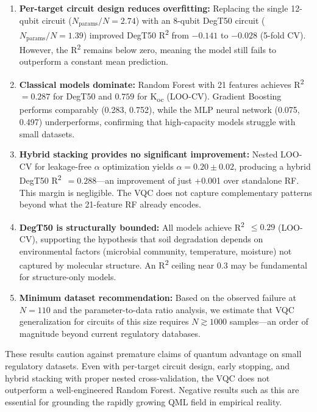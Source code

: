 \documentclass[twoside,twocolumn,9pt]{article}
\newcommand{\degtl}{DegT50}
\newcommand{\koc}{K\textsubscript{oc}}
\newcommand{\rtwo}{R\textsuperscript{2}}
\newcommand{\loocv}{LOO-CV}
\newcommand{\nsub}{110}
\begin{document}
\begin{enumerate}
  \item \textbf{Per-target circuit design reduces overfitting:} Replacing
        the single 12-qubit circuit ($N_\text{params}/N = 2.74$) with an
        8-qubit \degtl{} circuit ($N_\text{params}/N = 1.39$) improved
        \degtl{} \rtwo{} from $-0.141$ to $-0.028$ (5-fold CV). However,
        the \rtwo{} remains below zero, meaning the model still fails to
        outperform a constant mean prediction.

  \item \textbf{Classical models dominate:} Random Forest with 21 features
        achieves \rtwo{}~$= 0.287$ for \degtl{} and $0.759$ for \koc{}
        (\loocv{}). Gradient Boosting performs comparably (0.283, 0.752),
        while the MLP neural network (0.075, 0.497) underperforms,
        confirming that high-capacity models struggle with small datasets.

  \item \textbf{Hybrid stacking provides no significant improvement:}
        Nested LOO-CV for leakage-free $\alpha$ optimization yields
        $\alpha = 0.20 \pm 0.02$, producing a hybrid \degtl{}
        \rtwo{}~$= 0.288$---an improvement of just +0.001 over standalone
        RF. This margin is negligible. The VQC does not capture
        complementary patterns beyond what the 21-feature RF already
        encodes.

  \item \textbf{\degtl{} is structurally bounded:} All models achieve
        \rtwo{}~$\leq 0.29$ (\loocv{}), supporting the hypothesis that
        soil degradation depends on environmental factors (microbial
        community, temperature, moisture) not captured by molecular
        structure. An \rtwo{} ceiling near 0.3 may be fundamental for
        structure-only models.

  \item \textbf{Minimum dataset recommendation:} Based on the observed
        failure at $N = \nsub{}$ and the parameter-to-data ratio analysis,
        we estimate that VQC generalization for circuits of this size
        requires $N \gtrsim 1000$ samples---an order of magnitude beyond
        current regulatory databases.
\end{enumerate}

These results caution against premature claims of quantum advantage on
small regulatory datasets. Even with per-target circuit design, early
stopping, and hybrid stacking with proper nested cross-validation, the
VQC does not outperform a well-engineered Random Forest. Negative results
such as this are essential for grounding the rapidly growing QML field
in empirical reality.
\end{document}
